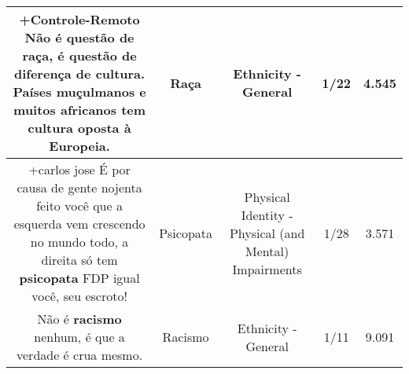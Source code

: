 \documentclass[11pt]{article}
\newlength\mylength
\begin{document}
\begin{center}
\begin{longtable}{|C{.65\mylength}|C{.30\mylength}|C{.12\mylength}|C{.12\mylength}|C{.12\mylength}|}
  \small +Controle-Remoto Não é questão de \textbf{raça}, é questão de diferença de cultura. Países muçulmanos e muitos africanos tem cultura oposta à Europeia.\normalsize   & Raça & Ethnicity - General & 1/22 & 4.545 \\  \hline
  \small +carlos jose É por causa de gente nojenta feito você que a esquerda vem crescendo no mundo todo, a direita só tem \textbf{psicopata} FDP igual você, seu escroto!\normalsize   & Psicopata & Physical Identity - Physical (and Mental) Impairments & 1/28 & 3.571 \\  \hline
  \small Não é \textbf{racismo} nenhum, é que a verdade é crua mesmo.\normalsize   & Racismo & Ethnicity - General & 1/11 & 9.091 \\  \hline
  
\end{longtable}
\end{center}
\end{document}
